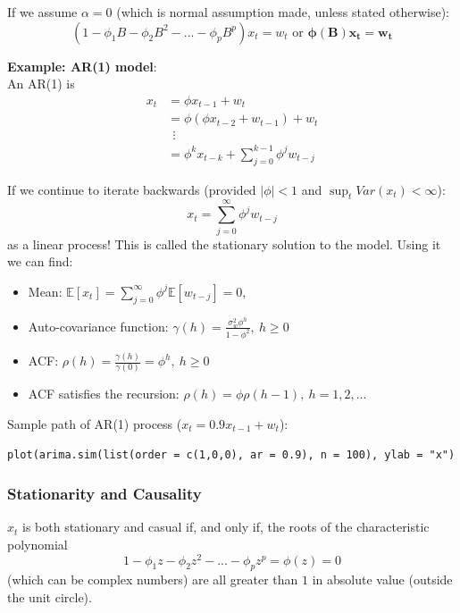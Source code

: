 \documentclass[11pt]{article}
\newcommand{\noi}{\noindent}
\begin{document}
\noi If we assume $\alpha = 0$ (which is normal assumption made, unless stated otherwise):
$$(1 - \phi_1B - \phi_2B^2 - ... - \phi_pB^p)x_t = w_t \text{ or } \boldsymbol{\phi(B)x_t = w_t}$$

\noi \textbf{Example: AR(1) model}: \\
\noi An AR(1) is
\begin{align*}
    x_t &= \phi x_{t-1} + w_t \\
    &= \phi(\phi x_{t-2} + w_{t-1}) + w_t \\
    & \ \ \vdots \\
    &= \phi^k x_{t-k} + \sum_{j=0}^{k-1}{\phi^j w_{t-j}}
\end{align*} \phantom{i}

\noi If we continue to iterate backwards (provided $|\phi| < 1$ and $\sup_tVar(x_t) < \infty$):
$$x_t = \sum_{j=0}^{\infty}{\phi^j w_{t-j}}$$
\noi as a linear process! This is called the stationary solution to the model. Using it we can find:
\begin{itemize}
    \item Mean: $\mathbb{E}[x_t] = \sum_{j=0}^{\infty}\phi^j\mathbb{E}[w_{t-j}] = 0$,
    \item Auto-covariance function: $\gamma(h) = \frac{\sigma_w^2 \phi^h}{1 - \phi^2}, \: h \geq 0$
    \item ACF: $\rho(h) = \frac{\gamma(h)}{\gamma(0)} = \phi^h, \: h \geq 0$
    \item ACF satisfies the recursion: $\rho(h) = \phi \rho(h-1), \: h=1,2,...$
\end{itemize} \phantom{i}

\noi Sample path of AR(1) process ($x_t = 0.9x_{t-1} + w_t$):
\begin{lstlisting}
plot(arima.sim(list(order = c(1,0,0), ar = 0.9), n = 100), ylab = "x")
\end{lstlisting}

\subsubsection{Stationarity and Causality}
\noi $x_t$ is both stationary and casual if, and only if, the roots of the characteristic polynomial
$$1 - \phi_1z - \phi_2z^2 - ... - \phi_pz^p = \phi(z) = 0$$
\noi (which can be complex numbers) are all greater than $1$ in absolute value (outside the unit circle).
\end{document}
